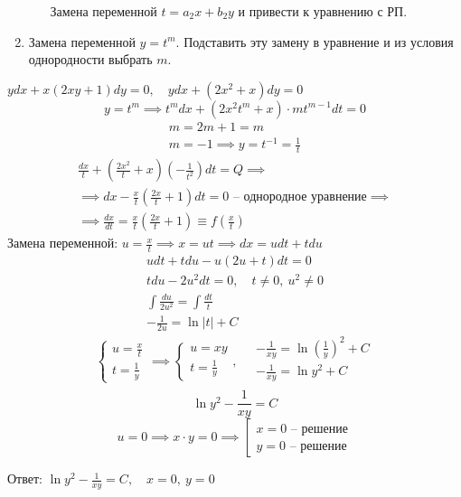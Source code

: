 \begin{note}
\begin{enumerate}
\begin{enumerate}
                        Замена переменной $t = a_2x + b_2 y$ и привести к уравнению с РП.
              \end{enumerate}
        \item Замена переменной $y = t^m$. Подставить эту замену в уравнение и из условия однородности выбрать $m$.
    \end{enumerate}
\end{note}

\begin{example}
    $ydx + x(2xy + 1)dy = 0, \quad ydx + (2x^2 + x)dy = 0$
    \[
        y = t^m \implies t^mdx + (2x^2t^m + x)\cdot mt^{m-1}dt = 0
    \]
    \begin{align*}
        m = 2m + 1 = m \\
        m = -1 \implies y = t^{-1} = \frac{1}{t}
    \end{align*}
    \begin{multline*}
        \frac{dx}{t} + \left(\frac{2x^2}{t} + x\right)\left(-\frac{1}{t^2}\right)dt = Q \implies \\
        \implies dx - \frac{x}{t}\left(\frac{2x}{t} + 1\right)dt = 0\text{ -- однородное уравнение}\implies \\
        \implies \frac{dx}{dt}=\frac{x}{t}\left(\frac{2x}{t} + 1\right)\equiv f\left(\frac{x}{t}\right)
    \end{multline*}
    Замена переменной: $u = \frac{x}{t}\implies x = ut \implies dx = udt + tdu$
    \begin{align*}
        udt + tdu - u(2u + t)dt = 0               \\
        tdu - 2u^2dt = 0, \quad t\ne0, \ u^2\ne 0 \\
        \int \frac{du}{2u^2} = \int \frac{dt}{t}  \\
        -\frac{1}{2u} = \ln|t| + C
    \end{align*}
    \[
        \left\{\begin{array}{l}
            u = \frac{x}{t} \\
            t=\frac{1}{y}
        \end{array}\right. \implies \left\{\begin{array}{l}
            u = xy \\ t = \frac{1}{y}
        \end{array}\right., \quad \begin{array}{l}
            -\frac{1}{xy} = \ln \left(\frac{1}{y}\right)^2 + C \\
            -\frac{1}{xy} = \ln y^2 + C                        \\
        \end{array}
    \]
    \[
        \ln y^2 - \frac{1}{xy} = C
    \]
    \[
        u = 0 \implies x\cdot y = 0 \implies \left[\begin{array}{l}
            x = 0\text{ -- решение} \\
            y = 0\text{ -- решение}
        \end{array}\right.
    \]

    Ответ: $\ln y^2 - \frac{1}{xy} = C, \quad x=0, \ y=0$
\end{example}

